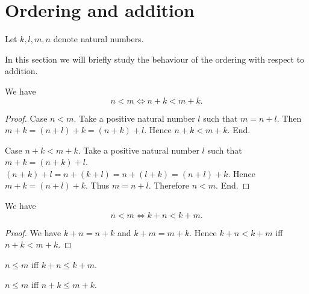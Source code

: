 \documentclass[../../arithmetic.ftl.tex]{subfiles}
\begin{document}
  \section{Ordering and addition}

  \begin{forthel}
  \end{forthel}

  \begin{forthel}
    Let $k, l, m, n$ denote natural numbers.
  \end{forthel}

  \noindent In this section we will briefly study the behaviour of the ordering
  with respect to addition.

  \begin{forthel}
    \begin{proposition}\label{Arithmetic_02_02_179654}
      We have \[ n < m \iff n + k < m + k. \]
    \end{proposition}
    \begin{proof}
      Case $n < m$.
        Take a positive natural number $l$ such that $m = n + l$.
        Then $m + k = (n + l) + k = (n + k) + l$.
        Hence $n + k < m + k$.
      End.

      Case $n + k < m + k$.
        Take a positive natural number $l$ such that $m + k = (n + k) + l$.
        $(n + k) + l = n + (k + l) = n + (l + k) = (n + l) + k$.
        Hence $m + k = (n + l) + k$.
        Thus $m = n + l$.
        Therefore $n < m$.
      End.
    \end{proof}


    \begin{corollary}\label{Arithmetic_02_02_316437}
      We have \[ n < m \iff k + n < k + m. \]
    \end{corollary}
    \begin{proof}
      We have $k + n = n + k$ and $k + m = m + k$.
      Hence $k + n < k + m$ iff $n + k < m + k$.
    \end{proof}


    \begin{corollary}\label{Arithmetic_02_02_143631}
      $n \leq m$ iff $k + n \leq k + m$.
    \end{corollary}

    \begin{corollary}\label{Arithmetic_02_02_598206}
      $n \leq m$ iff $n + k \leq m + k$.
    \end{corollary}
  \end{forthel}
\end{document}
